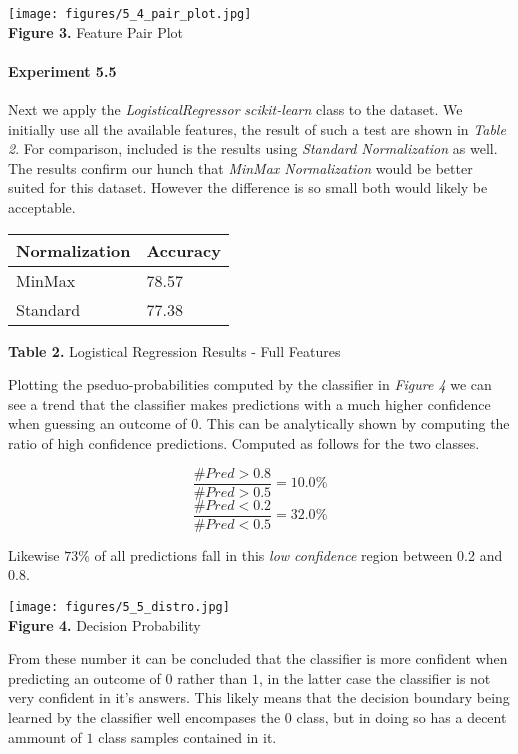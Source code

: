 \documentclass[11pt]{article}
\begin{document}
\texttt{[image: figures/5\_4\_pair\_plot.jpg]}\\
\textbf{Figure 3.} Feature Pair Plot

    \hypertarget{experiment-5.5}{%
\paragraph{Experiment 5.5}\label{experiment-5.5}}

Next we apply the \emph{LogisticalRegressor} \emph{scikit-learn} class
to the dataset. We initially use all the available features, the result
of such a test are shown in \emph{Table 2}. For comparison, included is
the results using \emph{Standard Normalization} as well. The results
confirm our hunch that \emph{MinMax Normalization} would be better
suited for this dataset. However the difference is so small both would
likely be acceptable.

\begin{longtable}[]{@{}ll@{}}
\toprule
Normalization & Accuracy \\
\midrule
\endhead
MinMax & 78.57 \\
Standard & 77.38 \\
\bottomrule
\end{longtable}

\textbf{Table 2.} Logistical Regression Results - Full Features

Plotting the pseduo-probabilities computed by the classifier in
\emph{Figure 4} we can see a trend that the classifier makes predictions
with a much higher confidence when guessing an outcome of \(0\). This
can be analytically shown by computing the ratio of high confidence
predictions. Computed as follows for the two classes.

\[
\frac{\# Pred > 0.8}{\# Pred > 0.5} = 10.0\%
\] \[
\frac{\# Pred < 0.2}{\# Pred < 0.5} = 32.0\%
\]

Likewise \(73\%\) of all predictions fall in this \emph{low confidence}
region between 0.2 and 0.8.

\texttt{[image: figures/5\_5\_distro.jpg]}\\
\textbf{Figure 4.} Decision Probability

From these number it can be concluded that the classifier is more
confident when predicting an outcome of \(0\) rather than \(1\), in the
latter case the classifier is not very confident in it's answers. This
likely means that the decision boundary being learned by the classifier
well encompases the \(0\) class, but in doing so has a decent ammount of
\(1\) class samples contained in it.
\end{document}
